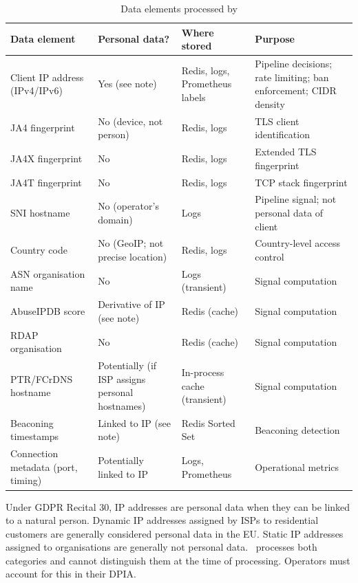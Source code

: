 \begin{fullwidth}
\begin{table}[h]
\caption{Data elements processed by \ja}
\label{tab:data-inventory}
\begin{tabular}{@{}lllp{4.5cm}@{}}
\toprule
\textbf{Data element} & \textbf{Personal data?} & \textbf{Where stored} & \textbf{Purpose} \\
\midrule
Client IP address (IPv4/IPv6) & Yes (see note) & Redis, logs, Prometheus labels & Pipeline decisions; rate limiting; ban enforcement; CIDR density \\
JA4 fingerprint & No (device, not person) & Redis, logs & TLS client identification \\
JA4X fingerprint & No & Redis, logs & Extended TLS fingerprint \\
JA4T fingerprint & No & Redis, logs & TCP stack fingerprint \\
SNI hostname & No (operator's domain) & Logs & Pipeline signal; not personal data of client \\
Country code & No (GeoIP; not precise location) & Redis, logs & Country-level access control \\
ASN organisation name & No & Logs (transient) & Signal computation \\
AbuseIPDB score & Derivative of IP (see note) & Redis (cache) & Signal computation \\
RDAP organisation & No & Redis (cache) & Signal computation \\
PTR/FCrDNS hostname & Potentially (if ISP assigns personal hostnames) & In-process cache (transient) & Signal computation \\
Beaconing timestamps & Linked to IP (see note) & Redis Sorted Set & Beaconing detection \\
Connection metadata (port, timing) & Potentially linked to IP & Logs, Prometheus & Operational metrics \\
\bottomrule
\end{tabular}
\end{table}
\end{fullwidth}

\begin{notebox}
Under GDPR Recital 30, IP addresses are personal data when they can be linked to a
natural person. Dynamic IP addresses assigned by ISPs to residential customers are
generally considered personal data in the EU. Static IP addresses assigned to
organisations are generally not personal data. \ja\ processes both categories and
cannot distinguish them at the time of processing. Operators must account for this
in their DPIA.
\end{notebox}

